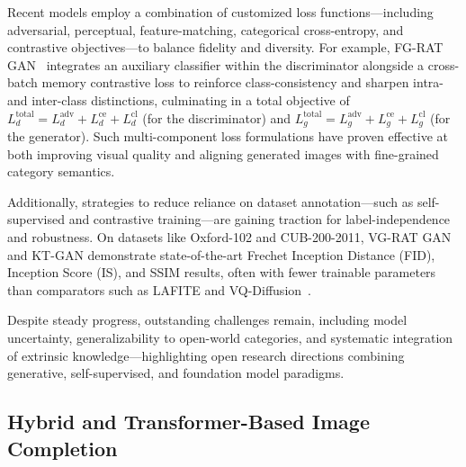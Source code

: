 \documentclass[sigconf]{acmart}
\begin{document}
Recent models employ a combination of customized loss functions—including adversarial, perceptual, feature-matching, categorical cross-entropy, and contrastive objectives—to balance fidelity and diversity. For example, FG-RAT GAN~\cite{ref101} integrates an auxiliary classifier within the discriminator alongside a cross-batch memory contrastive loss to reinforce class-consistency and sharpen intra- and inter-class distinctions, culminating in a total objective of $L_d^\text{total} = L_d^\text{adv} + L_d^\text{ce} + L_d^\text{cl}$ (for the discriminator) and $L_g^\text{total} = L_g^\text{adv} + L_g^\text{ce} + L_g^\text{cl}$ (for the generator). Such multi-component loss formulations have proven effective at both improving visual quality and aligning generated images with fine-grained category semantics.

Additionally, strategies to reduce reliance on dataset annotation—such as self-supervised and contrastive training—are gaining traction for label-independence and robustness. On datasets like Oxford-102 and CUB-200-2011, VG-RAT GAN and KT-GAN demonstrate state-of-the-art Frechet Inception Distance (FID), Inception Score (IS), and SSIM results, often with fewer trainable parameters than comparators such as LAFITE and VQ-Diffusion~\cite{ref94,ref96,ref101}.

Despite steady progress, outstanding challenges remain, including model uncertainty, generalizability to open-world categories, and systematic integration of extrinsic knowledge—highlighting open research directions combining generative, self-supervised, and foundation model paradigms.

\subsection{Hybrid and Transformer-Based Image Completion}
\end{document}
